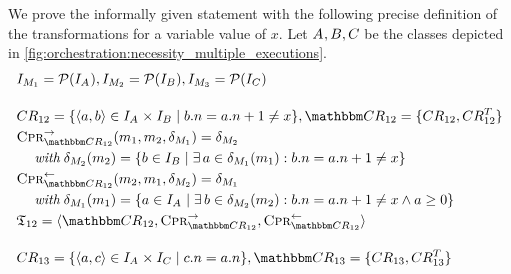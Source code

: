 We prove the informally given statement with the following precise definition of the transformations for a variable value of $x$.
Let $A_{}, B_{}, C_{}$ be the classes depicted in \autoref{fig:orchestration:necessity_multiple_executions}.
\begin{align*}
    & 
    \metamodelinstanceset{M}{1} = \mathcal{P}(\metamodelinstances{\class{A}{}}), %
    \metamodelinstanceset{M}{2} = \mathcal{P}(\metamodelinstances{\class{B}{}}), %
    \metamodelinstanceset{M}{3} = \mathcal{P}(\metamodelinstances{\class{C}{}}) \\[1em]
    &
    \consistencyrelation{CR}{12} = \setted{\tupled{a,b} \in \metamodelinstances{\class{A}{}} \times \metamodelinstances{\class{B}{}} \mid b.n = a.n + 1 \neq x}, \consistencyrelationset{CR}_{12} = \setted{\consistencyrelation{CR}{12}, \consistencyrelation{CR}{12}^T} \\
    &
    \consistencypreservationrule{\consistencyrelationset{CR}_{12}}^{\rightarrow}(\model{m}{1}, \model{m}{2}, \change{\metamodel{M}{1}}) = \change{\metamodel{M}{2}} \\
    & \formulaskip
    \mathtext{with} \change{\metamodel{M}{2}}(\model{m}{2}) = \setted{b \in \metamodelinstances{\class{B}{}} \mid \exists a \in \change{\metamodel{M}{1}}(\model{m}{1}) : b.n = a.n + 1 \neq x} \\
    & 
    \consistencypreservationrule{\consistencyrelationset{CR}_{12}}^{\leftarrow}(\model{m}{2}, \model{m}{1}, \change{\metamodel{M}{2}}) = \change{\metamodel{M}{1}} \\
    & \formulaskip
    \mathtext{with} \change{\metamodel{M}{1}}(\model{m}{1}) = \setted{a \in \metamodelinstances{\class{A}{}} \mid \exists b \in \change{\metamodel{M}{2}}(\model{m}{2}) : b.n = a.n + 1 \neq x \land a \geq 0} \\
    &
    \transformation{T}_{12} = \tupled{\consistencyrelationset{CR}_{12}, \consistencypreservationrule{\consistencyrelationset{CR}_{12}}^{\rightarrow}, \consistencypreservationrule{\consistencyrelationset{CR}_{12}}^{\leftarrow}} \\[1em]
    & 
    \consistencyrelation{CR}{13} = \setted{\tupled{a,c} \in \metamodelinstances{\class{A}{}} \times \metamodelinstances{\class{C}{}} \mid c.n = a.n}, \consistencyrelationset{CR}_{13} = \setted{\consistencyrelation{CR}{13}, \consistencyrelation{CR}{13}^T} \\

\end{align*}
